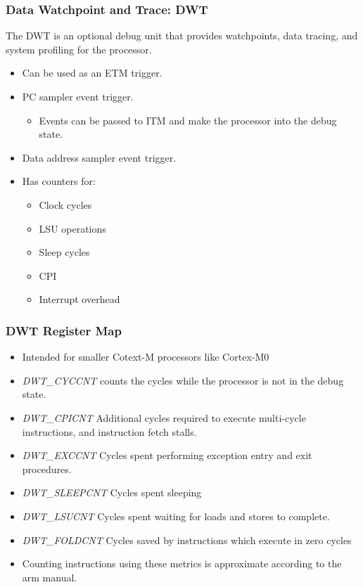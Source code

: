 \documentclass{beamer}
\begin{document}
\begin{frame}
    \frametitle{Data Watchpoint and Trace: DWT}
    The DWT is an optional debug unit that provides watchpoints, data tracing,
    and system profiling for the processor.
    \begin{itemize}
        \item Can be used as an ETM trigger.
        \item PC sampler event trigger.
            \begin{itemize}
                \item Events can be passed to ITM and make the processor
                    into the debug state.
            \end{itemize}
        \item Data address sampler event trigger.
        \item Has counters for:
            \begin{itemize}
                \item Clock cycles
                \item LSU operations
                \item Sleep cycles
                \item CPI
                \item Interrupt overhead
            \end{itemize}
    \end{itemize}
\end{frame}

\begin{frame}
    \frametitle{DWT Register Map}
    \begin{itemize}
        \item Intended for smaller Cotext-M processors like Cortex-M0
        \item \textit{DWT\_CYCCNT} counts the cycles while the processor is
            not in the debug state.
        \item \textit{DWT\_CPICNT} Additional cycles required to execute
            multi-cycle instructions, and instruction fetch stalls.
        \item \textit{DWT\_EXCCNT} Cycles spent performing exception entry
            and exit procedures.
        \item \textit{DWT\_SLEEPCNT} Cycles spent sleeping
        \item \textit{DWT\_LSUCNT} Cycles spent waiting for loads and stores
            to complete.
        \item \textit{DWT\_FOLDCNT} Cycles saved by instructions which execute in
            zero cycles
        \item Counting instructions using these metrics is approximate
            according to the arm manual.
    \end{itemize}
\end{frame}
\end{document}
